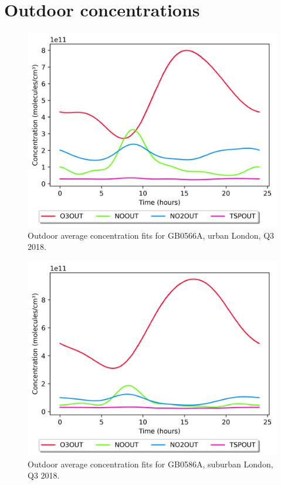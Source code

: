 \documentclass[a4paper]{refart}
\begin{document}
\section{Outdoor concentrations}\label{outdoor_fits}
\begin{figure}[h!]
    \centering
    \includegraphics[width=\textwidth]{London_urban.png}
    \caption{Outdoor average concentration fits for GB0566A, urban London, Q3 2018.}
    \label{fig:Out_lon_urb}
\end{figure}
\begin{figure}[h!]
    \centering
    \includegraphics[width=\textwidth]{London_suburban.png}
    \caption{Outdoor average concentration fits for GB0586A, suburban London, Q3 2018.}
    \label{fig:Out_lon_sub}
\end{figure}
\end{document}
